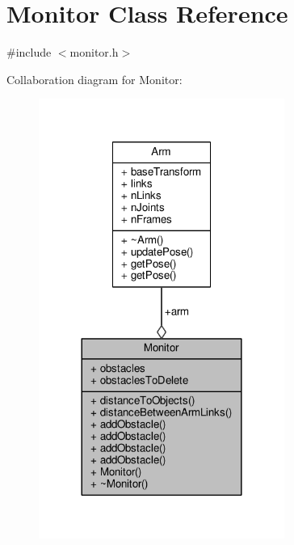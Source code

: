 \hypertarget{class_monitor}{}\section{Monitor Class Reference}
\label{class_monitor}


{\ttfamily \#include $<$monitor.\+h$>$}



Collaboration diagram for Monitor\+:\nopagebreak
\begin{figure}[H]
\begin{center}
\leavevmode
\includegraphics[width=228pt]{class_monitor__coll__graph}
\end{center}
\end{figure}
